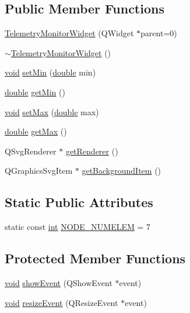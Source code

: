 \subsection*{Public Member Functions}
\begin{DoxyCompactItemize}
\item 
\hyperlink{group___core_plugin_gad504dfdc75617a3ffeca5fe48d5d4213}{Telemetry\-Monitor\-Widget} (Q\-Widget $\ast$parent=0)
\item 
\hyperlink{group___core_plugin_gaabfd0e1f4c040820ba4ad3c945d57fae}{$\sim$\-Telemetry\-Monitor\-Widget} ()
\item 
\hyperlink{group___u_a_v_objects_plugin_ga444cf2ff3f0ecbe028adce838d373f5c}{void} \hyperlink{group___core_plugin_ga62f75cdceb4772c546e7976cefa640c4}{set\-Min} (\hyperlink{_super_l_u_support_8h_a8956b2b9f49bf918deed98379d159ca7}{double} min)
\item 
\hyperlink{_super_l_u_support_8h_a8956b2b9f49bf918deed98379d159ca7}{double} \hyperlink{group___core_plugin_gaa48e3a67c60d209ac6f6bc4e22f0a83e}{get\-Min} ()
\item 
\hyperlink{group___u_a_v_objects_plugin_ga444cf2ff3f0ecbe028adce838d373f5c}{void} \hyperlink{group___core_plugin_gaaadf88ad2a3d337af50fa9ecca70994d}{set\-Max} (\hyperlink{_super_l_u_support_8h_a8956b2b9f49bf918deed98379d159ca7}{double} max)
\item 
\hyperlink{_super_l_u_support_8h_a8956b2b9f49bf918deed98379d159ca7}{double} \hyperlink{group___core_plugin_gaaafaa37d9270c6c00dca641b031dc01d}{get\-Max} ()
\item 
Q\-Svg\-Renderer $\ast$ \hyperlink{group___core_plugin_ga6b01d26a55c6500d36cfa7b0804bdd7e}{get\-Renderer} ()
\item 
Q\-Graphics\-Svg\-Item $\ast$ \hyperlink{group___core_plugin_ga5a468a0eff7d437394e1f4801c407248}{get\-Background\-Item} ()
\end{DoxyCompactItemize}
\subsection*{Static Public Attributes}
\begin{DoxyCompactItemize}
\item 
static const \hyperlink{ioapi_8h_a787fa3cf048117ba7123753c1e74fcd6}{int} \hyperlink{group___core_plugin_ga9fb2babad70f7d5d248f4dfe51cda6d5}{N\-O\-D\-E\-\_\-\-N\-U\-M\-E\-L\-E\-M} = 7
\end{DoxyCompactItemize}
\subsection*{Protected Member Functions}
\begin{DoxyCompactItemize}
\item 
\hyperlink{group___u_a_v_objects_plugin_ga444cf2ff3f0ecbe028adce838d373f5c}{void} \hyperlink{group___core_plugin_ga779c70f16ec4063c14a5cccf452ba141}{show\-Event} (Q\-Show\-Event $\ast$event)
\item 
\hyperlink{group___u_a_v_objects_plugin_ga444cf2ff3f0ecbe028adce838d373f5c}{void} \hyperlink{group___core_plugin_gac7d39d506412ed065e43035e2d80b6e7}{resize\-Event} (Q\-Resize\-Event $\ast$event)
\end{DoxyCompactItemize}


